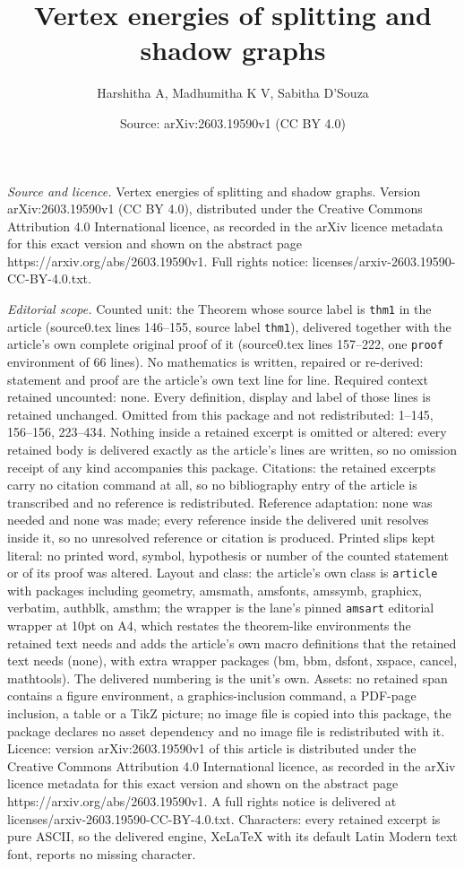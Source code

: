 \documentclass[10pt,a4paper]{amsart}
\title[Vertex energies of splitting and shadow graphs]{Vertex energies of splitting and shadow graphs}
\author{Harshitha A, Madhumitha K V, Sabitha D'Souza}
\date{Source: arXiv:2603.19590v1 (CC BY 4.0)}
\begin{document}
\maketitle

\noindent\emph{Source and licence.} Vertex energies of splitting and shadow graphs. Version arXiv:2603.19590v1 (CC BY 4.0), distributed under the Creative Commons Attribution 4.0 International licence, as recorded in the arXiv licence metadata for this exact version and shown on the abstract page https://arxiv.org/abs/2603.19590v1. Full rights notice: licenses/arxiv-2603.19590-CC-BY-4.0.txt.\par\smallskip

\noindent\textit{Editorial scope.} Counted unit: the Theorem whose source label is \texttt{thm1} in the article (source0.tex lines 146--155, source label \texttt{thm1}), delivered together with the article's own complete original proof of it (source0.tex lines 157--222, one \texttt{proof} environment of 66 lines). No mathematics is written, repaired or re-derived: statement and proof are the article's own text line for line. Required context retained uncounted: none. Every definition, display and label of those lines is retained unchanged. Omitted from this package and not redistributed: 1--145, 156--156, 223--434. Nothing inside a retained excerpt is omitted or altered: every retained body is delivered exactly as the article's lines are written, so no omission receipt of any kind accompanies this package. Citations: the retained excerpts carry no citation command at all, so no bibliography entry of the article is transcribed and no reference is redistributed. Reference adaptation: none was needed and none was made; every reference inside the delivered unit resolves inside it, so no unresolved reference or citation is produced. Printed slips kept literal: no printed word, symbol, hypothesis or number of the counted statement or of its proof was altered. Layout and class: the article's own class is \texttt{article} with packages including geometry, amsmath, amsfonts, amssymb, graphicx, verbatim, authblk, amsthm; the wrapper is the lane's pinned \texttt{amsart} editorial wrapper at 10pt on A4, which restates the theorem-like environments the retained text needs and adds the article's own macro definitions that the retained text needs (none), with extra wrapper packages (bm, bbm, dsfont, xspace, cancel, mathtools). The delivered numbering is the unit's own. Assets: no retained span contains a figure environment, a graphics-inclusion command, a PDF-page inclusion, a table or a TikZ picture; no image file is copied into this package, the package declares no asset dependency and no image file is redistributed with it. Licence: version arXiv:2603.19590v1 of this article is distributed under the Creative Commons Attribution 4.0 International licence, as recorded in the arXiv licence metadata for this exact version and shown on the abstract page https://arxiv.org/abs/2603.19590v1. A full rights notice is delivered at licenses/arxiv-2603.19590-CC-BY-4.0.txt. Characters: every retained excerpt is pure ASCII, so the delivered engine, XeLaTeX with its default Latin Modern text font, reports no missing character.
\end{document}
